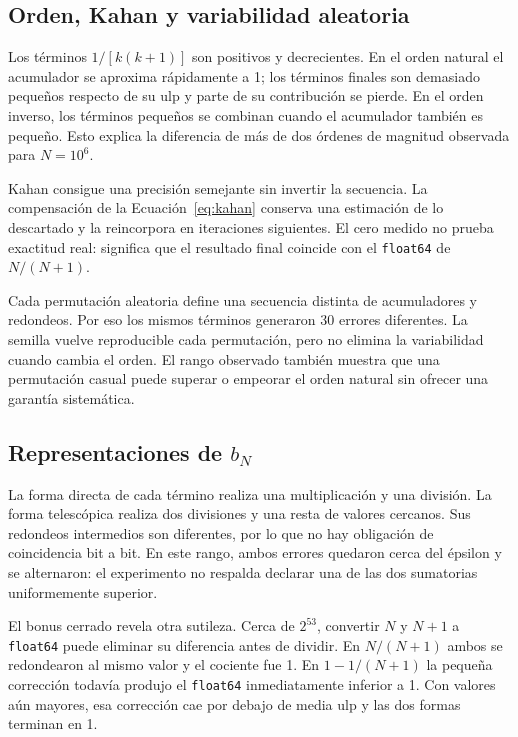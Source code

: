 \documentclass[11pt,a4paper]{article}
\newcommand{\codigo}[1]{\texttt{#1}}
\begin{document}
\subsection{Orden, Kahan y variabilidad aleatoria}

Los términos $1/[k(k+1)]$ son positivos y decrecientes. En el orden natural el acumulador se aproxima rápidamente a 1; los términos finales son demasiado pequeños respecto de su ulp y parte de su contribución se pierde. En el orden inverso, los términos pequeños se combinan cuando el acumulador también es pequeño. Esto explica la diferencia de más de dos órdenes de magnitud observada para $N=10^6$.

Kahan consigue una precisión semejante sin invertir la secuencia. La compensación de la Ecuación~\ref{eq:kahan} conserva una estimación de lo descartado y la reincorpora en iteraciones siguientes. El cero medido no prueba exactitud real: significa que el resultado final coincide con el \codigo{float64} de $N/(N+1)$.

Cada permutación aleatoria define una secuencia distinta de acumuladores y redondeos. Por eso los mismos términos generaron 30 errores diferentes. La semilla vuelve reproducible cada permutación, pero no elimina la variabilidad cuando cambia el orden. El rango observado también muestra que una permutación casual puede superar o empeorar el orden natural sin ofrecer una garantía sistemática.

\subsection{Representaciones de \texorpdfstring{$b_N$}{bN}}

La forma directa de cada término realiza una multiplicación y una división. La forma telescópica realiza dos divisiones y una resta de valores cercanos. Sus redondeos intermedios son diferentes, por lo que no hay obligación de coincidencia bit a bit. En este rango, ambos errores quedaron cerca del épsilon y se alternaron: el experimento no respalda declarar una de las dos sumatorias uniformemente superior.

El bonus cerrado revela otra sutileza. Cerca de $2^{53}$, convertir $N$ y $N+1$ a \codigo{float64} puede eliminar su diferencia antes de dividir. En $N/(N+1)$ ambos se redondearon al mismo valor y el cociente fue 1. En $1-1/(N+1)$ la pequeña corrección todavía produjo el \codigo{float64} inmediatamente inferior a 1. Con valores aún mayores, esa corrección cae por debajo de media ulp y las dos formas terminan en 1.
\end{document}
